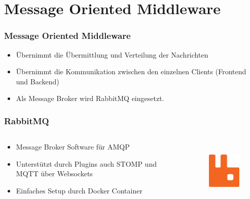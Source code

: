 \section{Message Oriented Middleware}
\begin{frame}
    \frametitle{Message Oriented Middleware}
    \begin{itemize}
        \item Übernimmt die Übermittlung und Verteilung der Nachrichten
        \item Übernimmt die Kommunikation zwischen den einzelnen Clients (Frontend und Backend)
        \item Als Message Broker wird RabbitMQ eingesetzt.
    \end{itemize}
\end{frame}

\begin{frame}
    \frametitle{RabbitMQ}
    \begin{columns}
        \begin{column}{0.68\textwidth}
            \begin{itemize}
                \item Message Broker Software für AMQP
                \item Unterstützt durch Plugins auch STOMP und MQTT über Websockets
                \item Einfaches Setup durch Docker Container
            \end{itemize}
        \end{column}
        \begin{column}{0.28\textwidth}
            \begin{figure}
                \centering
                \includegraphics[height=3cm]{media/RabbitMQ-01.eps}
            \end{figure}
        \end{column}
    \end{columns}
\end{frame}
